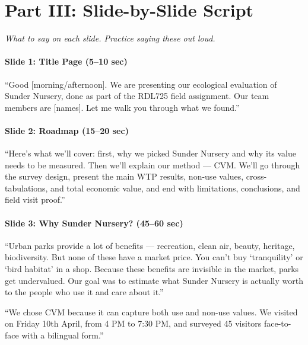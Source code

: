 \documentclass[11pt, a4paper]{article}
\newenvironment{ansbox}{%
    \def\FrameCommand{\textcolor{darkgreen}{\vrule width 2pt}\hspace{8pt}}%
    \MakeFramed{\advance\hsize-\width\FrameRestore}%
}{%
    \endMakeFramed%
}
\begin{document}
\newpage
\part*{Part III: Slide-by-Slide Script}

{\small\textit{What to say on each slide. Practice saying these out loud.}}

\subsection{Slide 1: Title Page \normalfont\small(5--10 sec)}
\begin{ansbox}
``Good [morning/afternoon]. We are presenting our ecological evaluation of Sunder Nursery, done as part of the RDL725 field assignment. Our team members are [names]. Let me walk you through what we found.''
\end{ansbox}

\subsection{Slide 2: Roadmap \normalfont\small(15--20 sec)}
\begin{ansbox}
``Here's what we'll cover: first, why we picked Sunder Nursery and why its value needs to be measured. Then we'll explain our method --- CVM. We'll go through the survey design, present the main WTP results, non-use values, cross-tabulations, and total economic value, and end with limitations, conclusions, and field visit proof.''
\end{ansbox}

\subsection{Slide 3: Why Sunder Nursery? \normalfont\small(45--60 sec)}
\begin{ansbox}
``Urban parks provide a lot of benefits --- recreation, clean air, beauty, heritage, biodiversity. But none of these have a market price. You can't buy `tranquility' or `bird habitat' in a shop. Because these benefits are invisible in the market, parks get undervalued. Our goal was to estimate what Sunder Nursery is actually worth to the people who use it and care about it.''

``We chose CVM because it can capture both use and non-use values. We visited on Friday 10th April, from 4 PM to 7:30 PM, and surveyed 45 visitors face-to-face with a bilingual form.''
\end{ansbox}
\end{document}
